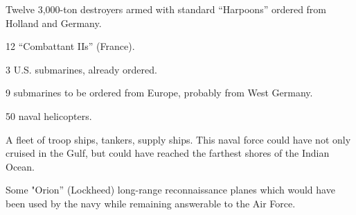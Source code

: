 Twelve 3,000-ton destroyers armed with standard “Harpoons” ordered from Holland and Germany. 

12 “Combattant IIs” (France). 

3 U.S. submarines, already ordered. 

9 submarines to be ordered from Europe, probably from West Germany. 

50 naval helicopters. 

A fleet of troop ships, tankers, supply ships. This naval force could have not only cruised in the Gulf, but could have reached the farthest shores of the Indian Ocean. 

Some "Orion” (Lockheed) long-range reconnaissance planes which would have been used by the navy while remaining answerable to the Air Force. 